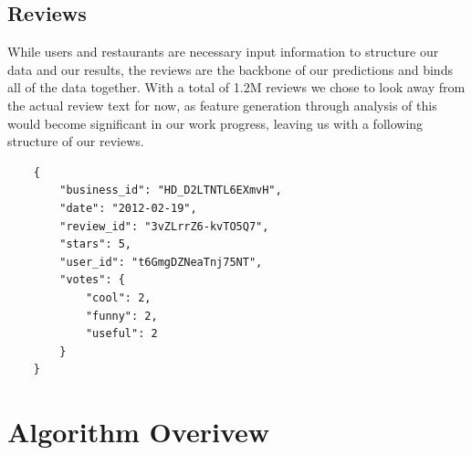 \documentclass[10pt,twocolumn,letterpaper]{article}
\begin{document}
\subsection{Reviews}
While users and restaurants are necessary input information to structure our data and our results, the reviews are the backbone of our predictions and binds all of the data together. With a total of 1.2M reviews we chose to look away from the actual review text for now, as feature generation through analysis of this would become significant in our work progress, leaving us with a following structure of our reviews.

\begin{verbatim}
	{
	    "business_id": "HD_D2LTNTL6EXmvH",
	    "date": "2012-02-19",
	    "review_id": "3vZLrrZ6-kvTO5Q7",
	    "stars": 5,
	    "user_id": "t6GmgDZNeaTnj75NT",
	    "votes": {
	        "cool": 2,
	        "funny": 2,
	        "useful": 2
	    }
	}
\end{verbatim}

\section{Algorithm Overivew}
\end{document}
